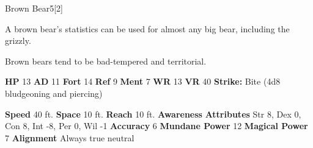  \begin{monsubsection}{Brown Bear}{5}[2]
    \vspace{-1em}\vspace{-1em}
    \vspace{0em}

    
          A brown bear's statistics can be used for almost any big bear, including the grizzly.
        
            Brown bears tend to be bad-tempered and territorial.
          

    \begin{spellcontent}
      \begin{spelltargetinginfo}
        \pari \textbf{HP} 13 \monsep
          \textbf{AD} 11 \monsep
          \textbf{Fort} 14 \monsep
          \textbf{Ref} 9 \monsep
          \textbf{Ment} 7
        \pari \textbf{WR} 13 \monsep
        \textbf{VR} 40
        \pari \textbf{Strike:}
            Bite  (4d8 bludgeoning and piercing)
      \end{spelltargetinginfo}
    \end{spellcontent}
    \begin{monsterfooter}
      \pari \textbf{Speed} 40 ft. \monsep
        \textbf{Space} 10 ft. \monsep
        \textbf{Reach} 10 ft.
      \pari \textbf{Awareness} 
      \pari \textbf{Attributes}
        Str 8, Dex 0,
        Con 8, Int -8,
        Per 0, Wil -1
      \pari \textbf{Accuracy} 6 \monsep
        \textbf{Mundane Power} 12 \monsep
      \textbf{Magical Power} 7
      \pari \textbf{Alignment} Always true neutral
    \end{monsterfooter}
  \end{monsubsection}
  
  
  
